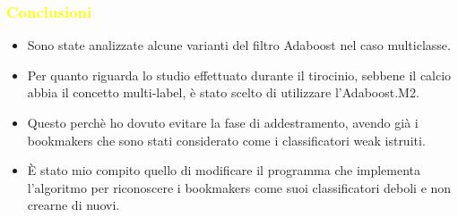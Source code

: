 \documentclass[handout
]{beamer}
\def\yellow#1{{\textcolor{yellow}{#1}}}
\begin{document}
\begin{frame}
\frametitle{\yellow{Conclusioni}}
\begin{itemize}
\item Sono state analizzate alcune varianti del filtro Adaboost nel caso multiclasse.
\item Per quanto riguarda lo studio effettuato durante il tirocinio, sebbene il calcio abbia il concetto multi-label, \`e stato scelto di utilizzare l'Adaboost.M2.
\item Questo perch\`e ho dovuto evitare la fase di addestramento, avendo gi\`a i bookmakers che sono stati considerato come i classificatori weak istruiti.
\item \`E stato mio compito quello di modificare il programma che implementa l'algoritmo per riconoscere i bookmakers come suoi classificatori deboli e non crearne di nuovi.
\end{itemize}
\end{frame}
\end{document}
